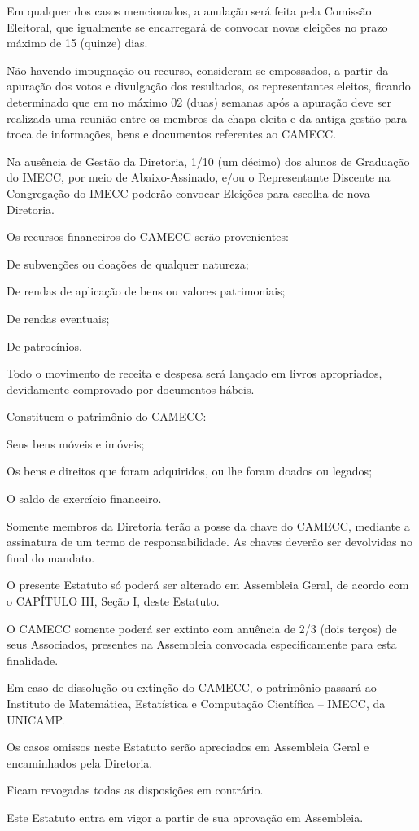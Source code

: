 \documentclass{estatuto}
\begin{document}
\paragrafounico Em qualquer dos casos mencionados, a anulação será feita pela Comissão Eleitoral, que igualmente se encarregará de convocar novas eleições no prazo máximo de 15 (quinze) dias.

\artigo Não havendo impugnação ou recurso, consideram-se empossados, a partir da apuração dos votos e divulgação dos resultados, os representantes eleitos, ficando determinado que em no máximo 02 (duas) semanas após a apuração deve ser realizada uma reunião entre os membros da chapa eleita e da antiga gestão para troca de informações, bens e documentos referentes ao CAMECC.

\artigo Na ausência de Gestão da Diretoria, 1/10 (um décimo) dos alunos de Graduação do IMECC, por meio de Abaixo-Assinado, e/ou o Representante Discente na Congregação do IMECC poderão convocar Eleições para escolha de nova Diretoria.


\artigo Os recursos financeiros do CAMECC serão provenientes:

\inciso De subvenções ou doações de qualquer natureza;

\inciso De rendas de aplicação de bens ou valores patrimoniais;

\inciso De rendas eventuais;

\inciso De patrocínios.

\artigo Todo o movimento de receita e despesa será lançado em livros apropriados, devidamente comprovado por documentos hábeis.

\artigo Constituem o patrimônio do CAMECC:

\inciso Seus bens móveis e imóveis;

\inciso Os bens e direitos que foram adquiridos, ou lhe foram doados ou legados;

\inciso O saldo de exercício financeiro.

\paragrafounico Somente membros da Diretoria  terão a posse da chave do CAMECC, mediante a assinatura de um termo de responsabilidade. As chaves deverão ser devolvidas no final do mandato.


\artigo O presente Estatuto só poderá ser alterado em Assembleia Geral, de acordo com o CAPÍTULO III, Seção I, deste Estatuto.

\artigo O CAMECC somente poderá ser extinto com anuência de 2/3 (dois terços) de seus Associados, presentes na Assembleia convocada especificamente para esta finalidade.

\paragrafounico Em caso de dissolução ou extinção do CAMECC, o patrimônio passará ao Instituto de Matemática, Estatística e Computação Científica – IMECC, da UNICAMP.

\artigo Os casos omissos neste Estatuto serão apreciados em Assembleia Geral e encaminhados pela Diretoria.

\artigo Ficam revogadas todas as disposições em contrário.

\artigo Este Estatuto entra em vigor a partir de sua aprovação em Assembleia.
\end{document}

